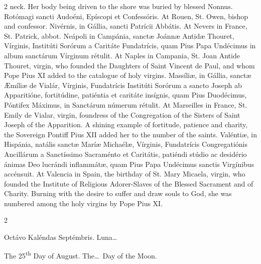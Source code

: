 \begin{paracol}{2}
 neck. Her body being driven to the shore was buried by blessed Nonnus.
\switchcolumn*
{}
Rotómagi sancti Audoéni, 
 Epíscopi et Confessóris.
\switchcolumn
{}
At Rouen, St. Owen, bishop and 
 confessor.
\switchcolumn*
{}
Nivérnis, in Gállia, 
 sancti Patrícii Abbátis.
\switchcolumn
{}
At Nevers in France, St. Patrick, 
 abbot.
\switchcolumn*
{}
Neápoli in Campánia, sanctæ Joánnæ Antidæ Thouret, Vírginis, Institúti Sorórum a Caritáte 
 Fundatrícis, quam Pius Papa Undécimus in album sanctárum Vírginum rétulit.
\switchcolumn
{}
At Naples in Campania, St. Joan 
 Antide Thouret, virgin, who founded the Daughters of Saint Vincent de Paul, 
 and whom Pope Pius XI added to the catalogue of holy virgins.
\switchcolumn*
{}
Massíliæ, in Gállia, 
 sanctæ Æmíliæ de Vialár, Vírginis, Fundatrícis Institúti Sorórum a sancto 
 Joseph ab Apparitióne, fortitúdine, patiéntia et caritáte insígnis, quam 
 Pius Duodécimus, Póntifex Máximus, in Sanctárum númerum rétulit.
\switchcolumn
{}
At Marseilles in France, St. Emily 
 de Vialar, virgin, foundress of the Congregation of the Sisters of Saint 
 Joseph of the Apparition. A shining example of fortitude, patience and 
 charity, the Sovereign Pontiff Pius XII added her to the number of the 
 saints.
\switchcolumn*
{}
Valéntiæ, in Hispánia, 
 natális sanctæ Maríæ Michaélæ, Vírginis, Fundatrícis Congregatiónis 
 Ancillárum a Sanctíssimo Sacraménto et Caritátis, patiéndi stúdio ac desidério ánimas Deo lucrándi inflammátæ, quam Pius Papa Undécimus sanctis 
 Virgínibus accénsuit.
\switchcolumn
{}
At Valencia in Spain, the birthday 
 of St. Mary Micaela, virgin, who founded the Institute of Religious 
 Adorer-Slaves of the Blessed Sacrament and of Charity. Burning with 
 the desire to suffer and draw souls to God, she was numbered among the holy 
 virgins by Pope Pius XI.
\switchcolumn*
{}
\end{paracol}


\begin{paracol}{2}
\begin{center}{\color{gregoriocolor} Octávo Kaléndas Septémbris. 
 Luna\dots\ }\end{center}
\switchcolumn
{}
\begin{center}{\color{gregoriocolor} The 
 25\textsuperscript{th} Day of 
 August. The\dots\ Day of the Moon.}\end{center}
\end{paracol}


